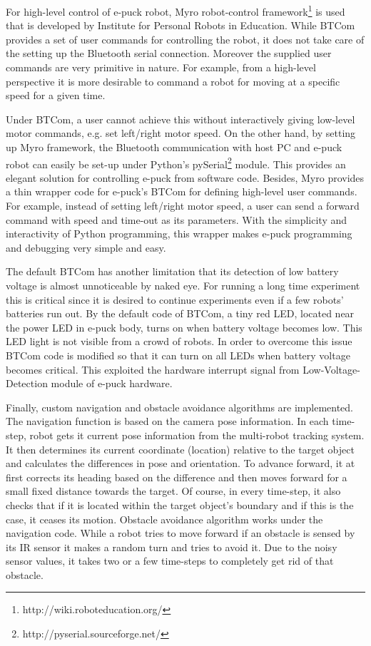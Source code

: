 For high-level control of e-puck robot,  Myro robot-control framework\footnote{http://wiki.roboteducation.org/} is used that is developed by Institute for Personal Robots in Education. While BTCom provides a set of user commands for controlling the robot, it does not take care of the setting up the Bluetooth serial connection. Moreover the supplied user commands are very primitive in nature. For example, from a high-level perspective it is more desirable to command a robot for moving at a specific speed for a given time.

Under BTCom, a user cannot achieve this without interactively giving low-level motor commands, e.g. set left/right motor speed. On the other hand, by setting up Myro framework, the Bluetooth communication with host PC and e-puck robot can easily be set-up under Python's pySerial\footnote{http://pyserial.sourceforge.net/} module. This provides an elegant solution for controlling e-puck from software code. Besides, Myro provides a thin wrapper code for e-puck's BTCom for defining high-level user commands. For example, instead of setting left/right motor speed, a user can send a forward command with speed and time-out as its parameters. With the simplicity and interactivity of Python programming, this wrapper makes e-puck programming and debugging very simple and easy.

The default BTCom has another limitation that its detection of low battery voltage is almost unnoticeable by naked eye. For running a long time experiment this is critical since it is desired to continue experiments even if a few robots' batteries run out. By the default code of BTCom, a tiny red LED, located near the power LED in e-puck body, turns on when battery voltage becomes low. This LED light is not visible from a crowd of robots. In order to overcome this issue  BTCom code is modified so that it can turn on all LEDs when battery voltage becomes critical. This exploited the hardware interrupt signal from Low-Voltage-Detection module of e-puck hardware.

Finally, custom navigation and obstacle avoidance algorithms are implemented. The navigation function is based on the camera pose information. In each time-step, robot gets it current pose information from the multi-robot tracking system. It then determines its current coordinate (location) relative to the target object and calculates the differences in pose and orientation. To advance forward, it at first corrects its heading based on the difference and then moves forward for a small fixed distance towards the target. Of course, in every time-step, it also checks that if it is located within the target object's boundary and if this is the case, it ceases its motion. Obstacle avoidance algorithm works under the navigation code. While a robot tries to move forward if an obstacle is sensed by its IR sensor it makes a random turn and tries to avoid it. Due to the noisy sensor values, it takes two or a few time-steps to completely get rid of that obstacle.
